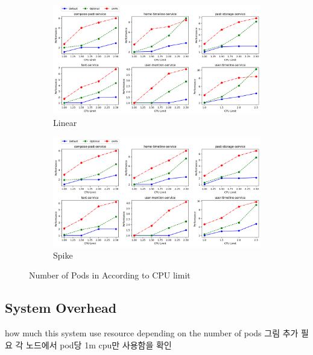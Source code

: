 \documentclass[conference]{IEEEtran}
\begin{document}
\begin{figure}[ht!]
    \begin{subfigure}{.5\textwidth}
        \centering
        \includegraphics[width=.95\linewidth]{leejaehong/images/evaluation/linear_result.png}
        \caption{Linear}
        \label{fig:num_of_pods_linear}
    \end{subfigure}
    \begin{subfigure}{.5\textwidth}
        \centering
        \includegraphics[width=.95\linewidth]{leejaehong/images/evaluation/spike_result.png}
        \caption{Spike}
        \label{fig:num_of_pods_spike}
    \end{subfigure}

    \caption{Number of Pods in According to CPU limit}
    \label{fig:num_of_pods}
\end{figure}



\subsection{System Overhead}
how much this system use resource depending on the number of pods
그림 추가 필요
각 노드에서 pod당 1m cpu만 사용함을 확인
\end{document}
